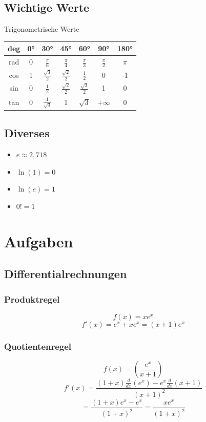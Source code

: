 \documentclass[a4paper,fontsize = 7pt]{scrartcl}
\begin{document}
\subsection{Wichtige Werte}
\begin{mainbox}{Trigonometrische Werte}
\begin{center}
 \begin{tabular}{c|cccccc}
  deg & 0° & 30° & 45° & 60° & 90° & 180° \\
  \midrule
  rad & 0 & $\frac{\pi}{6}$ & $\frac{\pi}{4}$ & $\frac{\pi}{3}$ & $\frac{\pi}{2}$ & $\pi$ \\
  cos & 1 & $\frac{\sqrt{3}}{2}$ & $\frac{\sqrt{2}}{2}$ & $\frac{1}{2}$ & 0 & -1 \\
  sin & 0 & $\frac{1}{2}$ & $\frac{\sqrt{2}}{2}$ & $\frac{\sqrt{3}}{2}$ & 1 & 0 \\
  tan & 0 & $\frac{1}{\sqrt{3}}$ & 1 & $\sqrt{3}$ & $+\infty$ & 0 \\
 \end{tabular}
\end{center}
\end{mainbox}

\subsection{Diverses}
\begin{itemize}
    \item $e \approx 2{,}718$
    \item $\ln(1) = 0$
    \item $\ln(e) = 1$
	\item $0! = 1$
\end{itemize}

\section{Aufgaben}
\subsection{Differentialrechnungen}
\subsubsection{Produktregel}
    \[f(x)=xe^x\]
    \[f'(x)=e^x+xe^x=(x+1)e^x\]
\subsubsection{Quotientenregel}
    \[f(x)=\left(\frac{e^x}{x+1}\right)\]
    \[f'(x)=\frac{(1+x)\frac{d}{dx}(e^x)-e^x\frac{d}{dx}(x+1)}{(x+1)^2}\]
    \[=\frac{(1+x)e^x -e^x}{(1+x)^2} = \frac{xe^x}{(1+x)^2}\]
\end{document}
